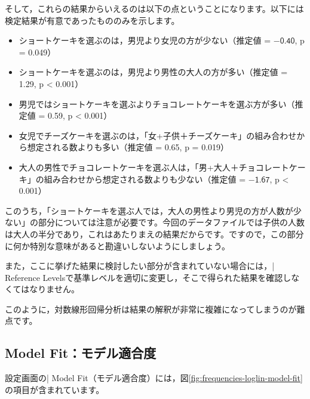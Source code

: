 \documentclass[
  12pt,
  a5jpaper,
  lualatex, ja=standard]{bxjsbook}
\providecommand{\tightlist}{%
  \setlength{\itemsep}{0pt}\setlength{\parskip}{0pt}}
\begin{document}
そして，これらの結果からいえるのは以下の点ということになります。以下には検定結果が有意であったもののみを示します。

\begin{itemize}
\tightlist
\item
  ショートケーキを選ぶのは，男児より女児の方が少ない（推定値 = \(-\textsf{0.40}\), p = 0.049）
\item
  ショートケーキを選ぶのは，男児より男性の大人の方が多い（推定値 = 1.29, p \textless{} 0.001）
\item
  男児ではショートケーキを選ぶよりチョコレートケーキを選ぶ方が多い（推定値 = 0.59, p \textless{} 0.001）
\item
  女児でチーズケーキを選ぶのは，「女+子供＋チーズケーキ」の組み合わせから想定される数よりも多い（推定値 = 0.65, p = 0.019）
\item
  大人の男性でチョコレートケーキを選ぶ人は，「男+大人＋チョコレートケーキ」の組み合わせから想定される数よりも少ない（推定値 = \(-\textsf{1.67}\), p \textless{} 0.001）
\end{itemize}

このうち，「ショートケーキを選ぶ人では，大人の男性より男児の方が人数が少ない」の部分については注意が必要です。今回のデータファイルでは子供の人数は大人の半分であり，これはあたりまえの結果だからです。ですので，この部分に何か特別な意味があると勘違いしないようにしましょう。

また，ここに挙げた結果に検討したい部分が含まれていない場合には，\colorbox{bar}{\textcolor{gmoji2}{| Reference Levels}}で基準レベルを適切に変更し，そこで得られた結果を確認しなくてはなりません。

このように，対数線形回帰分析は結果の解釈が非常に複雑になってしまうのが難点です。

\hypertarget{sub:frequencies-loglin-modelfit}{%
\subsection{Model Fit：モデル適合度}\label{sub:frequencies-loglin-modelfit}}

設定画面の\colorbox{bar}{\textcolor{gmoji2}{| Model Fit}}（モデル適合度）には，図\ref{fig:frequencies-loglin-model-fit}の項目が含まれています。
\end{document}
